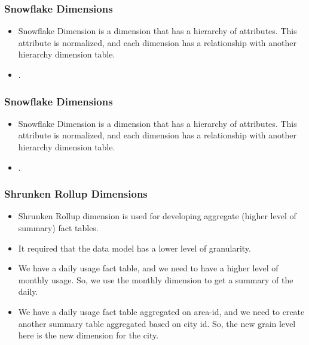 \VideoClassification[column=1, colour=blue]
\begin{frame}
    \frametitle{Snowflake Dimensions}
    \begin{itemize}[<+->]
        \item Snowflake Dimension is a dimension that has a hierarchy of attributes. This attribute is normalized, and each dimension has a relationship with another hierarchy dimension table.\\
        \item {}.
    \end{itemize}
\end{frame}
\begin{frame}
    \frametitle{Snowflake Dimensions}
    \begin{itemize}
        \item Snowflake Dimension is a dimension that has a hierarchy of attributes. This attribute is normalized, and each dimension has a relationship with another hierarchy dimension table.\\
		\item {}.
    \end{itemize}
    \centering
    
\end{frame}
\VideoClassification[column=1, colour=blue]
\begin{frame}
    \frametitle{Shrunken Rollup Dimensions}%
    \begin{itemize}[<+->]    	
		\item Shrunken Rollup dimension is used for developing aggregate (higher level of summary) fact tables. 
		\item It required that the data model has a lower level of granularity.
	\end{itemize}
		\begin{example}
		    \begin{itemize}[<+->]    	
			\item We have a daily usage fact table, and we need to have a higher level of monthly usage. So, we use the monthly dimension to get a summary of the daily.
			\item We have a daily usage fact table aggregated on area-id, and we need to create another summary table aggregated based on city id. So, the new grain level here is the new dimension for the city.
			\end{itemize}
		\end{example}
\end{frame}
